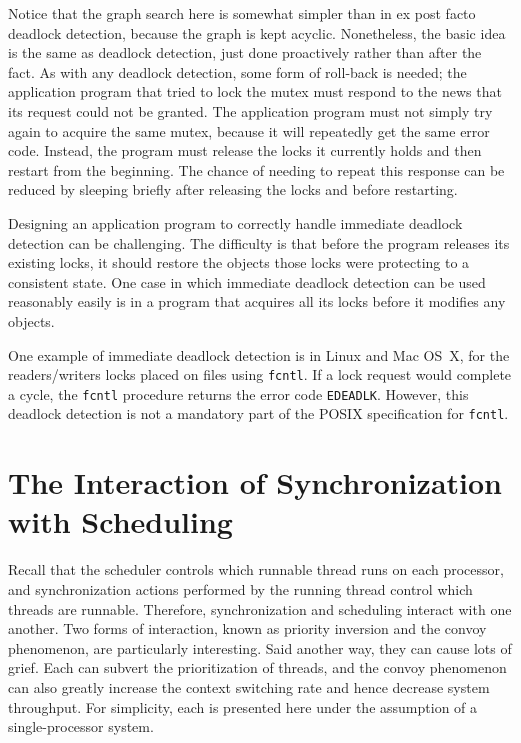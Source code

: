 Notice that the graph search here is somewhat simpler than in
ex post facto deadlock detection, because the graph is kept acyclic.
Nonetheless, the basic idea is the same as deadlock detection, just
done proactively rather than after the fact.  As with any deadlock
detection, some form of roll-back is needed; the application program
that tried to lock the mutex must respond to the news that its request
could not be granted.  The application program must not simply try
again to acquire the same mutex, because it will repeatedly get the
same error code.  Instead, the program must release the locks it
currently holds and then restart from the beginning.  The chance of
needing to repeat this response can be reduced by sleeping briefly
after releasing the locks and before restarting.

Designing an application program to correctly handle immediate
deadlock detection can be challenging.  The difficulty is that before
the program releases its existing locks, it should restore the objects
those locks were protecting to a consistent state.  One case in which
immediate deadlock detection can be used reasonably easily is in a
program that acquires all its locks before it modifies any objects.

One example of immediate deadlock detection is in
Linux and Mac OS~X, for the readers/writers locks placed on files using
\verb|fcntl|.  If a lock request would complete a cycle, the
\verb|fcntl| procedure returns the error code \verb|EDEADLK|.  However, this
deadlock detection is not a mandatory part of the POSIX specification
for \verb|fcntl|.

\section{The Interaction of Synchronization with Scheduling}\label{synchronization-and-scheduling-section}

Recall that the scheduler controls which runnable thread runs on each processor, and
synchronization actions performed by the running thread control which
threads are runnable.  Therefore, synchronization and scheduling interact with one another.
Two forms of interaction, known as priority inversion and the convoy
phenomenon, are particularly interesting.  Said another way, they can
cause lots of grief.  Each can subvert the prioritization of threads,
and the convoy phenomenon can also greatly increase the context
switching rate and hence decrease system throughput.
For simplicity, each is presented here under the assumption of a single-processor system.

